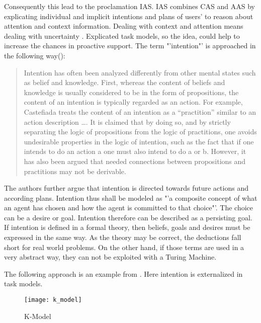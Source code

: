 Consequently this lead to the proclamation \ac{IAS}. \ac{IAS} combines \acs{CAS} and \acs{AAS} by explicating individual and implicit intentions and plans of users' to reason about attention and context information. Dealing with context and attention means dealing with uncertainty . Explicated task models, so the idea, could help to increase the chances in proactive support. The term "'intention"' is  approached in the following way(\cite{cohen1990intention}):
\begin{quotation}
Intention has often been analyzed differently from other mental states such as belief and knowledge. First, whereas the content of beliefs and knowledge is usually considered to be in the form of propositions, the content of an intention is typically regarded as an action. For example, Castefiada treats the content of an intention as a "`practition"' similar to an action description \dots. It is claimed that by doing so, and by strictly separating the logic of propositions from the logic of practitions, one avoids undesirable properties in the logic of intention, such as the fact that if one intends to do an action a one must also intend to do a or b. However, it has also been argued that needed connections between propositions and practitions may not be derivable.
\end{quotation}
The authors further argue that intention is directed towards future actions and according plans. Intention thus shall be modeled as "'a composite concept of what an agent has chosen and how the agent is committed to that choice"'. The choice can be a desire or goal. Intention therefore can be described as a persisting goal. If intention is defined in a formal theory, then beliefs, goals and desires must be expressed in the same way. As the theory may be correct, the deductions fall short for real world problems. On the other hand, if those terms are used in a very abstract way, they can not be exploited with a Turing Machine. 

The following approach is an example from \cite{schmidt2011task}. Here intention is externalized in task models. 

\begin{figure}[ht]
	\centering
  \texttt{[image: k\_model]}
	\caption{K-Model}
	\label{fig4}
\end{figure}

